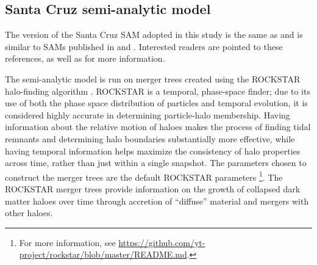 \documentclass[fleqn,usenatbib]{mnras}
\begin{document}
\subsection{Santa Cruz semi-analytic model}
\label{sec:sam}

The version of the Santa Cruz SAM adopted in this study is the same as \citet{Austen+2021} and is similar to SAMs published in \citet{2015MNRAS.453.4337S} and \citet{somerville:2021}. Interested readers are pointed to these references, as well as \citet{2008MNRAS.391..481S} for more information.

The semi-analytic model is run on merger trees created using the \textsc{ROCKSTAR} halo-finding algorithm \citep{2013ApJ...762..109B}. \textsc{ROCKSTAR} is a temporal, phase-space finder; due to its use of both the phase space distribution of particles and temporal evolution, it is considered highly accurate in determining particle-halo membership. Having information about the relative motion of haloes makes the process of finding tidal remnants and determining halo boundaries substantially more effective, while having temporal information helps maximize the consistency of halo properties across time, rather than just within a single snapshot. The parameters chosen to construct the merger trees are the default \textsc{ROCKSTAR} parameters \footnote{For more information, see \url{https://github.com/yt-project/rockstar/blob/master/README.md}.}. The \textsc{ROCKSTAR} merger trees provide information on the growth of collapsed dark matter haloes over time through accretion of ``diffuse'' material and mergers with other haloes.
\end{document}
